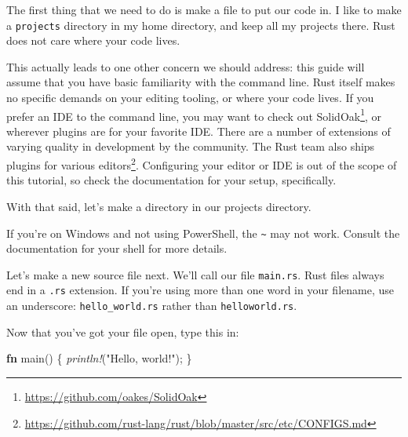 \documentclass[a4paper,]{book}
\newenvironment{Shaded}{\begin{snugshade}}{\end{snugshade}}
\newcommand{\KeywordTok}[1]{\textcolor[rgb]{0.13,0.29,0.53}{\textbf{{#1}}}}
\newcommand{\StringTok}[1]{\textcolor[rgb]{0.31,0.60,0.02}{{#1}}}
\newcommand{\PreprocessorTok}[1]{\textcolor[rgb]{0.56,0.35,0.01}{\textit{{#1}}}}
\newcommand{\NormalTok}[1]{{#1}}
\renewcommand{\href}[2]{#2\footnote{\url{#1}}}
\begin{document}
The first thing that we need to do is make a file to put our code in. I
like to make a \texttt{projects} directory in my home directory, and
keep all my projects there. Rust does not care where your code lives.

This actually leads to one other concern we should address: this guide
will assume that you have basic familiarity with the command line. Rust
itself makes no specific demands on your editing tooling, or where your
code lives. If you prefer an IDE to the command line, you may want to
check out \href{https://github.com/oakes/SolidOak}{SolidOak}, or
wherever plugins are for your favorite IDE. There are a number of
extensions of varying quality in development by the community. The Rust
team also ships
\href{https://github.com/rust-lang/rust/blob/master/src/etc/CONFIGS.md}{plugins
for various editors}. Configuring your editor or IDE is out of the scope
of this tutorial, so check the documentation for your setup,
specifically.

With that said, let's make a directory in our projects directory.

\begin{Shaded}
\end{Shaded}

If you're on Windows and not using PowerShell, the
\texttt{\textasciitilde{}} may not work. Consult the documentation for
your shell for more details.

Let's make a new source file next. We'll call our file \texttt{main.rs}.
Rust files always end in a \texttt{.rs} extension. If you're using more
than one word in your filename, use an underscore:
\texttt{hello\_world.rs} rather than \texttt{helloworld.rs}.

Now that you've got your file open, type this in:

\begin{Shaded}
\begin{Highlighting}[]
\KeywordTok{fn} \NormalTok{main() \{}
    \PreprocessorTok{println!}\NormalTok{(}\StringTok{"Hello, world!"}\NormalTok{);}
\NormalTok{\}}
\end{Highlighting}
\end{Shaded}
\end{document}
